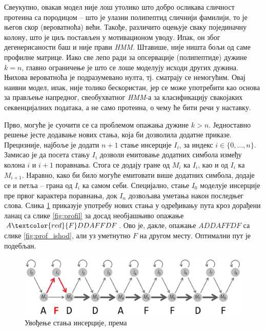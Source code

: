 \documentclass[12pt,oneside]{memoir}
\begin{document}
\begin{CJK}{UTF8}{ipxm}
Свеукупно, овакав модел није лош утолико што добро осликава сличност протеина са породицом -- што је улазни полипептид сличнији фамилији, то је његов скор (вероватноћа) већи. Такође, различито оцењује сваку појединачну колону, што је циљ постављен у мотивационом уводу. Ипак, он због дегенерисаности баш и није прави \textit{HMM}. Штавише, није ништа бољи од саме профилне матрице. Иако све лепо ради за опсервације (полипептиде) дужине $k = n$, главно ограничење је што се лоше моделују исходи других дужина. Њихова вероватноћа је подразумевано нулта, тј. сматрају се немогућим. Овај наивни модел, ипак, није толико бескористан, јер се може употребити као основа за прављење напредног, свеобухватног \textit{HMM}-а за класификацију свакојаких секвенцијалних података, а не само протеина, о чему ће бити речи у наставку.

Прво, могуће је суочити се са проблемом опажања дужине $k > n$. Једноставно решење јесте додавање нових стања, која би дозволила додатне приказе. Прецизније, најбоље је додати $n+1$ стање инсерције $I_i$, за индекс $i \in \{0, ..., n\}$. Замисао је да посета стању $I_i$ дозволи емитовање додатних симбола између колона $i$ и $i+1$ поравнања. Стога се додају гране од $M_i$ ка $I_i$, као и од $I_i$ ка $M_{i+1}$. Наравно, како би било могуће емитовати више додатних симбола, додаје се и петља -- грана од $I_i$ ка самом себи. Специјално, стање $I_0$ моделује инсерције пре првог карактера поравнања, док $I_n$ дозвољава уметања након последњег слова. Слика \ref{fig:insercije} приказује употребу нових стања у одређивању пута кроз дорађени ланац са слике \ref{fig:profil} за досад необјашњиво опажање $A\textcolor{red}{F}DDAFFDF$. Ово је, дакле, опажање $ADDAFFDF$ са слике \ref{fig:prof_ishod}, али уз уметнутно $F$ на другом месту. Оптимални пут је подебљан.

\begin{figure}[H]
  \centering
  \includegraphics[width=\textwidth]{insercije.png}
  \caption{Увођење стања инсерције, према \cite{compeau2015}}
  \label{fig:insercije}
\end{figure}


\end{CJK}
\end{document}
